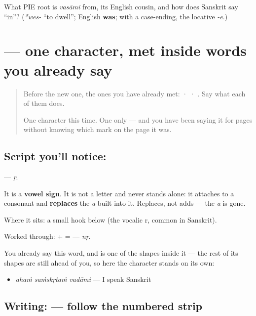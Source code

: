 \begin{tcolorbox}[breakable,colback=teal!4,colframe=teal!35!black,title={Before you move on}]
What PIE root is \emph{vasāmi} from, its English cousin, and how does Sanskrit say \textquotedblleft{}in\textquotedblright{}? (\emph{*wes-} \textquotedblleft{}to dwell\textquotedblright{}; English \textbf{was}; with a case-ending, the locative \emph{-e}.)
\end{tcolorbox}
\section[\texorpdfstring{\sk{ृ} (ṛ)}{ृ (ṛ)}]{ — one character, met inside words you already say}

\label{lesson:SA-S205-vowel-sign-vocalic-r}



\begin{quote}
Before the new one, the ones you have already met:  ·  · . Say what each of them does.

One character this time. One only — and you have been saying it for pages without knowing which mark on the page it was.
\end{quote}

\subsection*{Script you'll notice: }
\textbf{} — \emph{ṛ}.

It is a \textbf{vowel sign}. It is not a letter and never stands alone: it attaches to a consonant and \textbf{replaces} the \emph{a} built into it. Replaces, not adds — the \emph{a} is gone.

Where it sits: a small hook below (the vocalic r, common in Sanskrit).

Worked through: \textbf{} + \textbf{} = \textbf{} — \emph{nṛ}.

You already say this word, and  is one of the shapes inside it — the rest of its shapes are still ahead of you, so here the character stands on its own:

\begin{itemize}
\raggedright
  \item \emph{ahaṁ saṁskṛtaṁ vadāmi} — I speak Sanskrit
\end{itemize}

\subsection*{Writing:  — follow the numbered strip}

